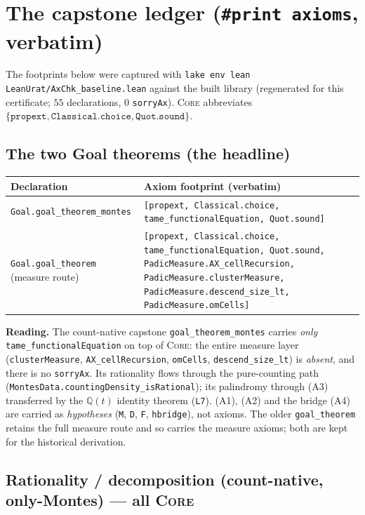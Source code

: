 \documentclass[11pt]{article}
\newcommand{\bbQ}{\mathbb{Q}}
\newcommand{\code}[1]{\texttt{#1}}
\newcommand{\Core}{\textsc{Core}}
\begin{document}
\section{The capstone ledger (\code{\#print axioms}, verbatim)}\label{sec:capstones}

The footprints below were captured with \code{lake env lean LeanUrat/AxChk\_baseline.lean}
against the built library (regenerated for this certificate; $55$ declarations, $0$
\code{sorryAx}). \Core{} abbreviates $\{\code{propext},\code{Classical.choice},
\code{Quot.sound}\}$.

\subsection{The two Goal theorems (the headline)}

\begin{longtable}{@{}p{}p{}@{}}
\toprule
\textbf{Declaration} & \textbf{Axiom footprint (verbatim)} \\
\midrule
\endhead
\code{Goal.goal\_theorem\_montes} & \code{[propext, Classical.choice,
tame\_functionalEquation, Quot.sound]} \\
\code{Goal.goal\_theorem} (measure route) & \code{[propext, Classical.choice,
tame\_functionalEquation, Quot.sound, PadicMeasure.AX\_cellRecursion,
PadicMeasure.clusterMeasure, PadicMeasure.descend\_size\_lt, PadicMeasure.omCells]} \\
\bottomrule
\end{longtable}

\noindent\textbf{Reading.} The count-native capstone \code{goal\_theorem\_montes}
carries \emph{only} \code{tame\_functionalEquation} on top of \Core: the entire measure
layer (\code{clusterMeasure}, \code{AX\_cellRecursion}, \code{omCells},
\code{descend\_size\_lt}) is \emph{absent}, and there is no \code{sorryAx}. Its rationality
flows through the pure-counting path
(\code{MontesData.countingDensity\_isRational}); its palindromy through (A3) transferred
by the $\bbQ(t)$ identity theorem (\code{L7}). (A1), (A2) and the bridge (A4) are carried
as \emph{hypotheses} (\code{M}, \code{D}, \code{F}, \code{hbridge}), not axioms. The older
\code{goal\_theorem} retains the full measure route and so carries the measure axioms;
both are kept for the historical derivation.

\subsection{Rationality / decomposition (count-native, only-Montes) --- all \Core}
\end{document}
